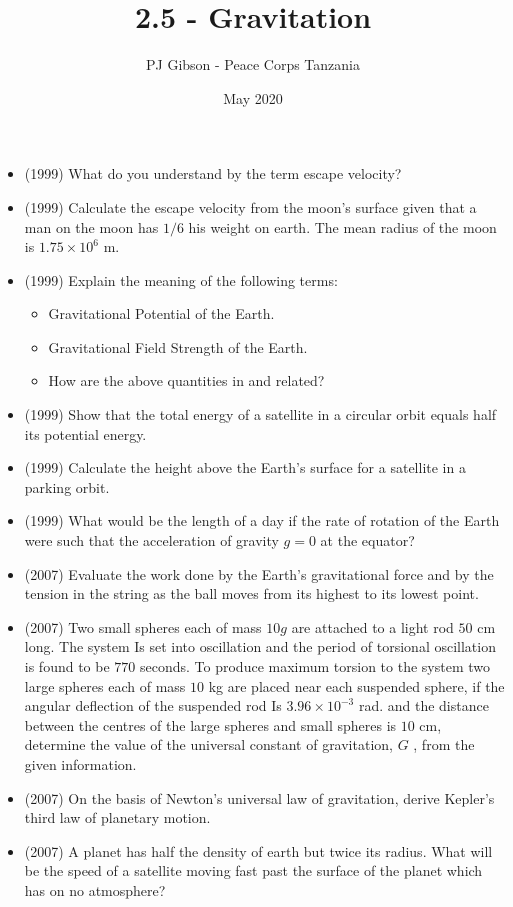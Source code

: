 \documentclass{article}
\title{\textbf{2.5 - Gravitation}}
\author{PJ Gibson - Peace Corps Tanzania}
\date{May 2020}
\begin{document}
\maketitle

\begin{itemize}
\item (1999)  What do you understand by the term escape velocity?
\item (1999)  Calculate the escape velocity from the moon’s surface given that a man on the moon has $ 1/6$ his weight on earth. The mean radius of the moon is $ 1.75 \times 10^6$ m.
\item (1999)  Explain the meaning of the following terms:
 \begin{itemize}
\item Gravitational Potential of the Earth.
\item Gravitational Field Strength of the Earth.
\item How are the above quantities in and related?
\end{itemize}
\item (1999)  Show that the total energy of a satellite in a circular orbit equals half its potential energy.
\item (1999)  Calculate the height above the Earth's surface for a satellite in a parking orbit.
\item (1999)  What would be the length of a day if the rate of rotation of the Earth were such that the acceleration of gravity $ g=0$ at the equator?
\item (2007)  Evaluate the work done by the Earth's gravitational force and by the tension in the string as the ball moves from its highest to its lowest point.
\item (2007)  Two small spheres each of mass $ 10g$ are attached to a light rod $ 50$ cm long. The system Is set into oscillation and the period of torsional oscillation is found to be $ 770$ seconds. To produce maximum torsion to the system two large spheres each of mass $ 10$ kg are placed near each suspended sphere, if the angular deflection of the suspended rod Is $ 3.96 \times 10^{-3}$ rad. and the distance between the centres of the large spheres and small spheres is $ 10$ cm, determine the value of the universal constant of gravitation, $ G$ , from the given information. 
\item (2007)  On the basis of Newton’s universal law of gravitation, derive Kepler’s third law of planetary motion. 
\item (2007)  A planet has half the density of earth but twice its radius. What will be the speed of a satellite moving fast past the surface of the planet which has on no atmosphere?

\end{itemize}
\end{document}
